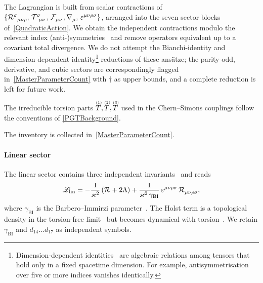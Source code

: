 The Lagrangian is built from scalar contractions of
$\{\MAGF{^\sigma_{\mu\nu\rho}},\,\MAGT{^\sigma_{\mu\nu}}\!,\,\FieldF{_{\mu\nu}},\rcD{_\mu},\,\varepsilon^{\mu\nu\rho\sigma}\}$,
arranged into the seven sector blocks of~\cref{QuadraticAction}.
We obtain the independent
contractions modulo
the relevant index (anti-)symmetries~\cite{nutma2014xtras} and remove operators equivalent up to a covariant
total divergence. We do not attempt the Bianchi-identity and
dimension-dependent-identity\footnote{Dimension-dependent
identities~\cite{edgarhoglund2002ddi} are algebraic relations
among tensors that hold only
in a fixed spacetime dimension. For example,
antisymmetrisation over five or more indices
vanishes identically.}
reductions of these ans\"atze; the
parity-odd, derivative, and cubic sectors are correspondingly
flagged in~\cref{MasterParameterCount} with $\dagger$ as upper
bounds, and a complete reduction is left for future work.

The irreducible torsion parts $\T[1]{},\T[2]{},\T[3]{}$ used in
the Chern--Simons couplings follow the conventions of
\cref{PGTBackground}.

The inventory is collected in~\cref{MasterParameterCount}.

\paragraph*{Linear sector}
\label{LinearSector}
The linear sector contains three independent
invariants~\cite{kibble1961lorentz,holst1995barbero} and reads
\begin{align}
  \lag_\text{lin}
  = -\frac{1}{\kappa^2}\,(\MAGF{}+2\Lambda)
  +\frac{1}{\kappa^2\,\gamma_\text{BI}}\,
   \varepsilon^{\mu\nu\rho\sigma}\,\MAGF{_{\mu\nu\rho\sigma}},
  \label{LinearAction}
\end{align}
where $\gamma_\text{BI}$ is the Barbero--Immirzi
parameter~\cite{barbero1995real,immirzi1997real}.
The Holst term is a topological density in the torsion-free
limit~\cite{hehlobukhov2007cartan,shapiro2002torsion} but
becomes dynamical with torsion~\cite{niehyan1982}.
We retain $\gamma_\text{BI}$ and $d_{14}\dots d_{17}$ as
independent symbols.

